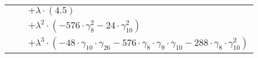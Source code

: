 \documentclass{article}
\begin{document}
\begin{table}[!hp]
\begin{center}
\begin{tabular}{rcl}
 & & $ + {\lambda}{\cdot}(4.5)$ \\
 & & $ + {\lambda}^2{\cdot}(-576{\cdot}{\gamma}_{8}^{2}-24{\cdot}{\gamma}_{10}^{2})$ \\
 & & $ + {\lambda}^3{\cdot}(-48{\cdot}{\gamma}_{10}{\cdot}{\gamma}_{26}-576{\cdot}{\gamma}_{8}{\cdot}{\gamma}_{9}{\cdot}{\gamma}_{10}-288{\cdot}{\gamma}_{8}{\cdot}{\gamma}_{10}^{2})$ \\
\end{tabular}
\end{center}
\end{table}
\end{document}
